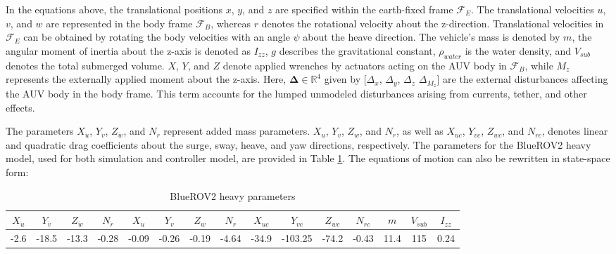 In the equations above, the translational positions $x$, $y$, and $z$ are specified within the earth-fixed frame $\mathcal{F}_E$. The translational velocities $u$, $v$, and $w$ are represented in the body frame $\mathcal{F}_B$, whereas $r$ denotes the rotational velocity about the z-direction. Translational velocities in $\mathcal{F}_E$ can be obtained by rotating the body velocities with an angle $\psi$ about the heave direction. The vehicle's mass is denoted by $m$, the angular moment of inertia about the z-axis is denoted as $I_{zz}$, $g$ describes the gravitational constant, $\rho_{water}$ is the water density, and $V_{sub}$ denotes the total submerged volume. $X$, $Y$, and $Z$ denote applied wrenches by actuators acting on the \ac{AUV} body in $\mathcal{F}_B$, while $M_z$ represents the externally applied moment about the z-axis. Here, $\mathbf{\Delta}  \in \mathbb{R}^{4}$ given by [$\Delta_{x}$, $\Delta_{y}$, $\Delta_{z}$ $\Delta_{M_z}$] are the external disturbances affecting the \ac{AUV} body in the body frame. This term accounts for the lumped unmodeled disturbances arising from currents, tether, and other effects.


The parameters $X_{\dot{u}}$, $Y_{\dot{v}}$, $Z_{\dot{w}}$, and $N_{\dot{r}}$ represent added mass parameters. $X_{u}$, $Y_{v}$, $Z_{w}$, and $N_{r}$, as well as $X_{uc}$, $Y_{vc}$, $Z_{wc}$, and $N_{rc}$, denotes linear and quadratic drag coefficients about the surge, sway, heave, and yaw directions, respectively. The parameters for the BlueROV2 heavy model, used for both simulation and controller model, are provided in Table \ref{tab:brovparams}. The equations of motion can also be rewritten in state-space form:



\begin{table}[t]
\caption{BlueROV2 heavy parameters}
\centering %
\setlength{\tabcolsep}{3pt} %
\renewcommand{\arraystretch}{1.4} %

\begin{tabular}{|c|c|c|c|c|c|c|c|c|c|c|c|c|c|c|}
\hline
$X_{\dot{u}}$ & $Y_{\dot{v}}$ & $Z_{\dot{w}}$ & $N_{\dot{r}}$ & 
$X_{u}$ & $Y_{v}$ & $Z_{w}$ & $N_{r}$ & $X_{uc}$ & $Y_{vc}$ & $Z_{wc}$ & $N_{rc}$ & $m$ & $V_{sub}$ & $I_{zz}$ \\ \hline
-2.6 & -18.5 & -13.3 & -0.28 & 
-0.09 & -0.26 & -0.19 & -4.64 & -34.9 & -103.25 & -74.2 & -0.43 & 11.4 & 115 & 0.24 \\ \hline
\end{tabular}

\label{tab:brovparams}
\vspace{-0.3cm}
\end{table}







